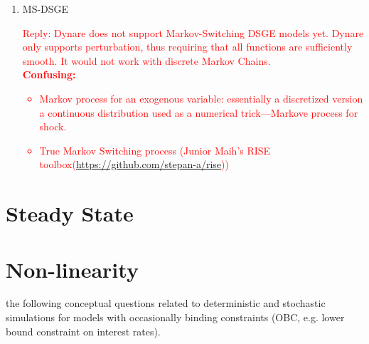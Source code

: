 \documentclass[10pt,math=newtx,citestyle=gb7714-2015,bibstyle=gb7714-2015]{elegantbook}
\begin{document}
{{{\begin{enumerate}
		\textcolor{red}{Reply:
			\begin{itemize}
				\item It is generalized eigenvalues. This is not a problem, unless you get oscillating IRFs.
				\item No, this is not appropriate. There is one unique correct timing and you cannot arbitarily shift timing.
			\end{itemize}
		}
		\item MS-DSGE\\
		\textcolor{red}{Reply: Dynare does not support Markov-Switching DSGE models yet. Dynare only supports perturbation, thus requiring that all functions are sufficiently smooth. It would not work with discrete Markov Chains.\\
			\textbf{Confusing:}
			\begin{itemize}
				\item Markov process for an exogenous variable: essentially a discretized version a continuous distribution used as a numerical trick---Markove process for shock.
				\item True Markov Switching process (Junior Maih's RISE toolbox(\url{https://github.com/stepan-a/rise}))
			\end{itemize}
		}
		
		
	\end{enumerate}
	
	\section{Steady State}
	
	\section{Non-linearity}
	the following conceptual questions related to deterministic and stochastic simulations for models with occasionally binding constraints (OBC, e.g. lower bound constraint on interest rates).
	
}}}
\end{document}
